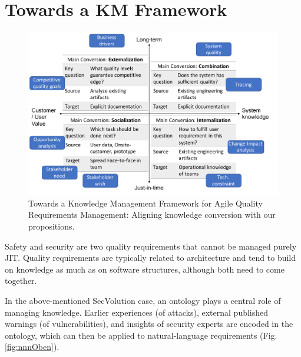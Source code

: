 \section{Towards a KM Framework}



\begin{figure}
    \centering
    \includegraphics[width=\columnwidth]{figs/km-framework}
    \caption{Towards a Knowledge Management Framework for Agile Quality Requirements Management: Aligning knowledge conversion with our propositions.}
    \label{fig:km_conversion}
\end{figure}




Safety and security are two quality requirements that cannot be managed purely JIT. Quality requirements are typically related to architecture %
and tend to build on knowledge as much as on software structures, although both need to come together.

In the above-mentioned SecVolution case, an ontology plays a central role of managing knowledge. %
Earlier experiences (of attacks), external published warnings (of vulnerabilities), and  insights of security experts are encoded in the ontology, which can then be applied  %
to natural-language  requirements (Fig. \ref{fig:nnnOben}). 


